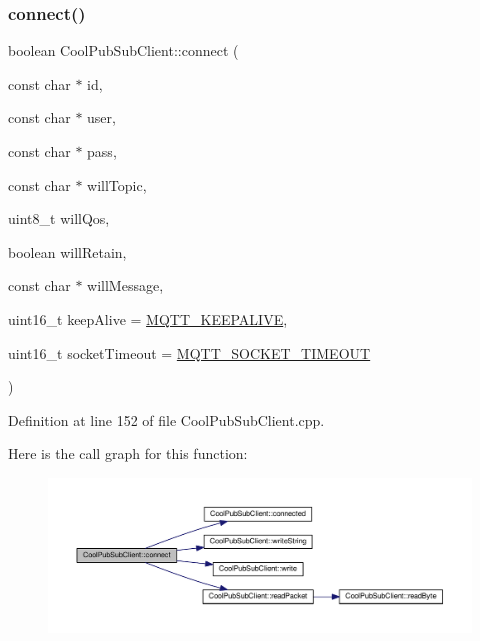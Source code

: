 \subsubsection{\texorpdfstring{connect()}{connect()}\hspace{0.1cm}{\footnotesize\ttfamily [4/4]}}
{\footnotesize\ttfamily boolean Cool\+Pub\+Sub\+Client\+::connect (\begin{DoxyParamCaption}\item[{const char $\ast$}]{id,  }\item[{const char $\ast$}]{user,  }\item[{const char $\ast$}]{pass,  }\item[{const char $\ast$}]{will\+Topic,  }\item[{uint8\+\_\+t}]{will\+Qos,  }\item[{boolean}]{will\+Retain,  }\item[{const char $\ast$}]{will\+Message,  }\item[{uint16\+\_\+t}]{keep\+Alive = {\ttfamily \hyperlink{_cool_pub_sub_client_8h_afb4dd8c75385ab30e659314df7c2c335}{M\+Q\+T\+T\+\_\+\+K\+E\+E\+P\+A\+L\+I\+VE}},  }\item[{uint16\+\_\+t}]{socket\+Timeout = {\ttfamily \hyperlink{_cool_pub_sub_client_8h_a092cc564e4d7f03fdab6137e30a7f05b}{M\+Q\+T\+T\+\_\+\+S\+O\+C\+K\+E\+T\+\_\+\+T\+I\+M\+E\+O\+UT}} }\end{DoxyParamCaption})}



Definition at line 152 of file Cool\+Pub\+Sub\+Client.\+cpp.

Here is the call graph for this function\+:\nopagebreak
\begin{figure}[H]
\begin{center}
\leavevmode
\includegraphics[width=350pt]{class_cool_pub_sub_client_a7e5a85731dd25d90a41f6d859e61da77_cgraph}
\end{center}
\end{figure}
\mbox{\label{class_cool_pub_sub_client_a3d5a5da4ddb1e5c1bea64d80c665d148}} 

